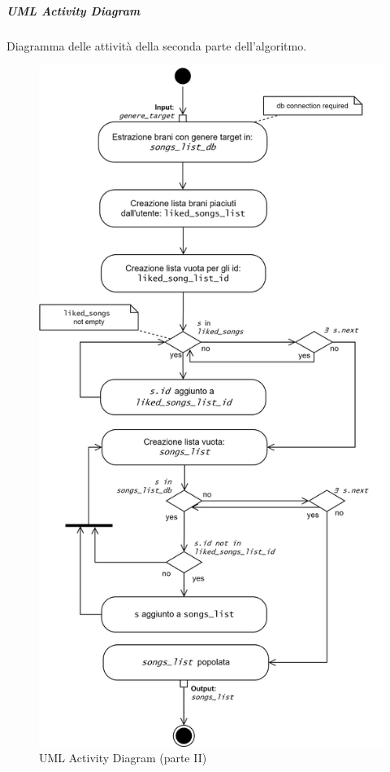 \newpage
\subparagraph{UML Activity Diagram}
Diagramma delle attività della seconda parte dell'algoritmo.
\begin{figure} [H]
    \centering
    \includegraphics[scale=0.75]{images/flowchart_2_UML.png}
    \caption{UML Activity Diagram (parte II)}
    \label{fig-uml-ac-2}
\end{figure}




